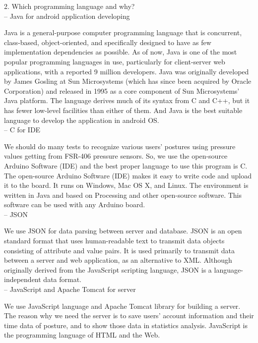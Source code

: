\documentclass[conference]{IEEEtran}
\begin{document}
2.	Which programming language and why?\\

-- Java for android application developing

Java is a general-purpose computer programming language that is concurrent, class-based, object-oriented, and specifically designed to have as few implementation dependencies as possible. As of now, Java is one of the most popular programming languages in use, particularly for client-server web applications, with a reported 9 million developers. Java was originally developed by James Gosling at Sun Microsystems (which has since been acquired by Oracle Corporation) and released in 1995 as a core component of Sun Microsystems' Java platform. The language derives much of its syntax from C and C++, but it has fewer low-level facilities than either of them. And Java is the best suitable language to develop the application in android OS.\\

-- C for IDE

We should do many tests to recognize various users' postures using pressure values getting from FSR-406 pressure sensors. So, we use the open-source Arduino Software (IDE) and the best proper language to use this program is C. The open-source Arduino Software (IDE) makes it easy to write code and upload it to the board. It runs on Windows, Mac OS X, and Linux. The environment is written in Java and based on Processing and other open-source software. This software can be used with any Arduino board.\\

-- JSON

We use JSON for data parsing between server and database. JSON is an open standard format that uses human-readable text to transmit data objects consisting of attribute and value pairs. It is used primarily to transmit data between a server and web application, as an alternative to XML. Although originally derived from the JavaScript scripting language, JSON is a language-independent data format.\\

-- JavaScript and Apache Tomcat for server

We use JavaScript language and Apache Tomcat library for building a server.
The reason why we need the server is to save users' account information and their time data of posture, and to show those data in statistics analysis. 
JavaScript is the programming language of HTML and the Web. 
\end{document}
